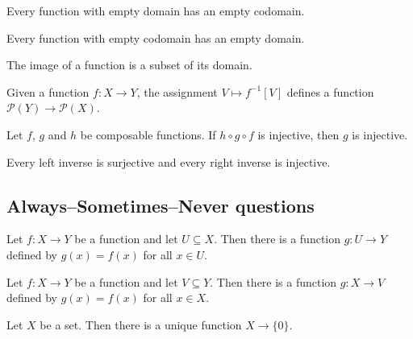 \begin{chapex} %
Every function with empty domain has an empty codomain.
\end{chapex}

\begin{chapex} %
Every function with empty codomain has an empty domain.
\end{chapex}

\begin{chapex} %
The image of a function is a subset of its domain.
\end{chapex}

\begin{chapex} %
Given a function $f : X \to Y$, the assignment $V \mapsto f^{-1}[V]$ defines a function $\mathcal{P}(Y) \to \mathcal{P}(X)$.
\end{chapex}

\begin{chapex} %
Let $f$, $g$ and $h$ be composable functions. If $h \circ g \circ f$ is injective, then $g$ is injective.
\end{chapex}

\begin{chapex} %
\label{cqFunctionsTFEnd}
Every left inverse is surjective and every right inverse is injective.
\end{chapex}

\subsection*{Always--Sometimes--Never questions}


\begin{chapex} %
\label{cqFunctionsASNBegin}
Let $f : X \to Y$ be a function and let $U \subseteq X$. Then there is a function $g : U \to Y$ defined by $g(x) = f(x)$ for all $x \in U$.
\end{chapex}

\begin{chapex} %
Let $f : X \to Y$ be a function and let $V \subseteq Y$. Then there is a function $g : X \to V$ defined by $g(x) = f(x)$ for all $x \in X$.
\end{chapex}

\begin{chapex} %
Let $X$ be a set. Then there is a unique function $X \to \{ 0 \}$.
\end{chapex}

